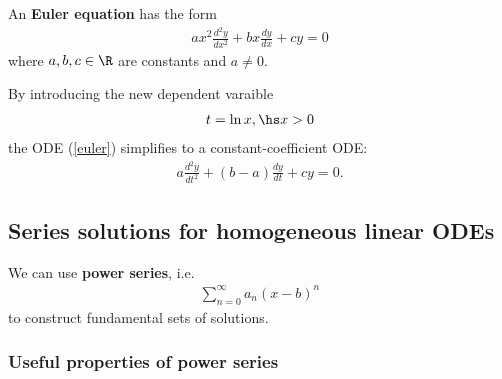 \documentclass{article}
\begin{document}
\begin{definition}
    An \textbf{Euler equation} has the form
    \begin{align}
        \label{euler}
        ax^2\frac{d^2y}{dx^2} + bx\frac{dy}{dx} + cy = 0
    \end{align}
    where $a,b,c\in\R$ are constants and $a\not=0$.
\end{definition}

\begin{theorem}
    By introducing the new dependent varaible
    \begin{align*}
        t=\ln x,\hs x>0
    \end{align*}
    the ODE (\ref{euler}) simplifies to a constant-coefficient ODE:
    \begin{align*}
        a\frac{d^2y}{dt^2}+(b-a)\frac{dy}{dt}+cy=0.
    \end{align*}
\end{theorem}


\subsection{Series solutions for homogeneous linear ODEs}


\begin{lemma}
    We can use \textbf{power series}, i.e.
    \begin{align}
        \label{pseries}
        \sum_{n=0}^\infty a_n (x-b)^n
    \end{align}
    to construct fundamental sets of solutions.
\end{lemma}

\subsubsection{Useful properties of power series}
\end{document}
